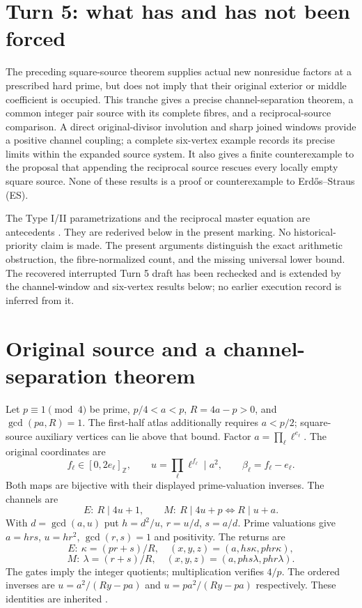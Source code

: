\section{Turn 5: what has and has not been forced}
The preceding square-source theorem supplies actual new nonresidue factors at a
prescribed hard prime, but does not imply that their original exterior or middle
coefficient is occupied. This tranche gives a precise channel-separation theorem,
a common integer pair source with its complete fibres, and a reciprocal-source
comparison. A direct original-divisor involution and sharp joined windows provide
a positive channel coupling; a complete six-vertex example records its precise
limits within the expanded source system. It also gives a finite counterexample to the proposal that appending
the reciprocal source rescues every locally empty square source. None of these
results is a proof or counterexample to Erd\H{o}s--Straus (ES).

The Type I/II parametrizations and the reciprocal master equation are antecedents
\cite[\S2]{ET}\cite[\S\S1--4]{BryanDual}. They are rederived below in the present
marking. No historical-priority claim is made. The present arguments distinguish the exact arithmetic obstruction, the
fibre-normalized count, and the missing universal lower bound. The recovered
interrupted Turn 5 draft has been rechecked and is extended by the channel-window
and six-vertex results below; no earlier execution record is inferred from it.

\section{Original source and a channel-separation theorem}
Let $p\equiv1\pmod4$ be prime, $p/4<a<p$, $R=4a-p>0$, and
$\gcd(pa,R)=1$. The first-half atlas additionally requires $a<p/2$; square-source
auxiliary vertices can lie above that bound. Factor $a=\prod_\ell\ell^{e_\ell}$.
The original coordinates are
\[
 f_\ell\in[0,2e_\ell]_{\mathbb Z},\qquad
 u=\prod_\ell\ell^{f_\ell}\mid a^2,\qquad
 \beta_\ell=f_\ell-e_\ell.                                  \tag{1}
\]
Both maps are bijective with their displayed prime-valuation inverses. The channels are
\[
 E:\ R\mid4u+1,\qquad M:\ R\mid4u+p\iff R\mid u+a.           \tag{2}
\]
With $d=\gcd(a,u)$ put $h=d^2/u$, $r=u/d$, $s=a/d$. Prime valuations give
$a=hrs$, $u=hr^2$, $\gcd(r,s)=1$ and positivity. The returns are
\[
 E:\ \kappa=(pr+s)/R,\quad (x,y,z)=(a,hs\kappa,phr\kappa),
\]
\[
 M:\ \lambda=(r+s)/R,\quad(x,y,z)=(a,phs\lambda,phr\lambda). \tag{3}
\]
The gates imply the integer quotients; multiplication verifies $4/p$.
The ordered inverses are $u=a^2/(Ry-pa)$ and $u=pa^2/(Ry-pa)$ respectively.
These identities are inherited \cite[Propositions 2.2 and 2.6]{ET}.

